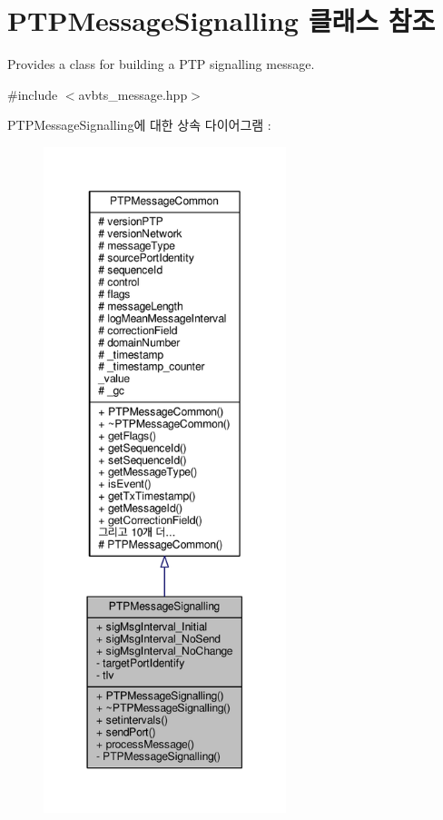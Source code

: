 \hypertarget{class_p_t_p_message_signalling}{}\section{P\+T\+P\+Message\+Signalling 클래스 참조}
\label{class_p_t_p_message_signalling}


Provides a class for building a P\+TP signalling message.  




{\ttfamily \#include $<$avbts\+\_\+message.\+hpp$>$}



P\+T\+P\+Message\+Signalling에 대한 상속 다이어그램 \+: 
\nopagebreak
\begin{figure}[H]
\begin{center}
\leavevmode
\includegraphics[height=550pt]{class_p_t_p_message_signalling__inherit__graph}
\end{center}
\end{figure}


